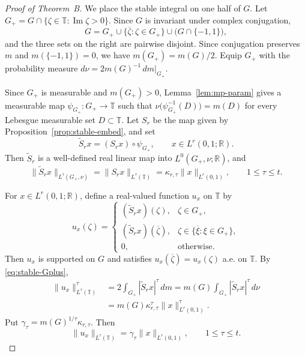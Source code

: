 \documentclass[11pt, reqno]{amsart}
\theoremstyle{definition}
\theoremstyle{remark}
\newcommand{\T}{\mathbb{T}}
\newcommand{\R}{\mathbb{R}}
\begin{document}
\begin{proof}[Proof of Theorem~B]
We place the stable integral on one half of \(G\).  Let
\(G_+=G\cap\{\zeta\in\T:\operatorname{Im}\zeta>0\}\). Since \(G\) is invariant under complex conjugation,
\[
        G
        =
        G_+
        \cup
        \{\overline\zeta:\zeta\in G_+\}
        \cup
        \bigl(G\cap\{-1,1\}\bigr),
\]
and the three sets on the right are pairwise disjoint. Since conjugation preserves \(m\) and \(m(\{-1,1\})=0\),
we have \(m(G_+)=m(G)/2\). Equip \(G_+\) with the probability measure
\(d\nu=2m(G)^{-1}\,dm|_{G_+}\).

Since \(G_+\) is measurable and \(m(G_+)>0\),
Lemma~\ref{lem:mp-param} gives a measurable map \(\psi_{G_+}\colon G_+\to\T\) such that
\(\nu\bigl(\psi_{G_+}^{-1}(D)\bigr)=m(D)
\)
for every Lebesgue measurable set \(D\subset\T\).
Let \(S_r\) be the map given by
Proposition~\ref{prop:stable-embed}, and set
\[
        \widetilde S_r x
        =
        (S_r x)\circ\psi_{G_+},
        \qquad
        x\in L^r(0,1;\R).
\]
Then \(\widetilde S_r\) is a well-defined real linear map into
\(L^0(G_+,\nu;\R)\), and
\begin{equation}
\label{eq:stable-Gplus}
        \|\widetilde S_r x\|_{L^\tau(G_+,\nu)}
        =
        \|S_r x\|_{L^\tau(\T)}
        =
        \kappa_{r,\tau}\|x\|_{L^r(0,1)},
        \qquad
        1\le\tau\le t.
\end{equation}

For \(x\in L^r(0,1;\R)\), define a real-valued function \(u_x\) on
\(\T\) by
\[
        u_x(\zeta)
        =
        \begin{cases}
        (\widetilde S_rx)(\zeta),
                & \zeta\in G_+,\\[1mm]
        (\widetilde S_rx)(\overline\zeta),
                & \zeta\in
                  \{\overline\xi:\xi\in G_+\},\\[1mm]
        0,
                & \text{otherwise}.
        \end{cases}
\]
Then \(u_x\) is supported on \(G\) and satisfies
\(u_x(\overline\zeta)=u_x(\zeta)\) a.e. on \(\T\).  By
\eqref{eq:stable-Gplus},
\[
\begin{aligned}
        \|u_x\|_{L^\tau(\T)}^\tau
        &=
        2\int_{G_+}|\widetilde S_rx|^\tau\,dm =
        m(G)\int_{G_+}|\widetilde S_rx|^\tau\,d\nu\\
        &=
        m(G)\kappa_{r,\tau}^\tau
        \|x\|_{L^r(0,1)}^\tau.
\end{aligned}
\]
Put \(\gamma_\tau=m(G)^{1/\tau}\kappa_{r,\tau}\).  Then
\begin{equation}
\label{eq:sym-moments}
        \|u_x\|_{L^\tau(\T)}
        =
        \gamma_\tau\|x\|_{L^r(0,1)},
        \qquad
        1\le\tau\le t.
\end{equation}


\end{proof}
\end{document}
